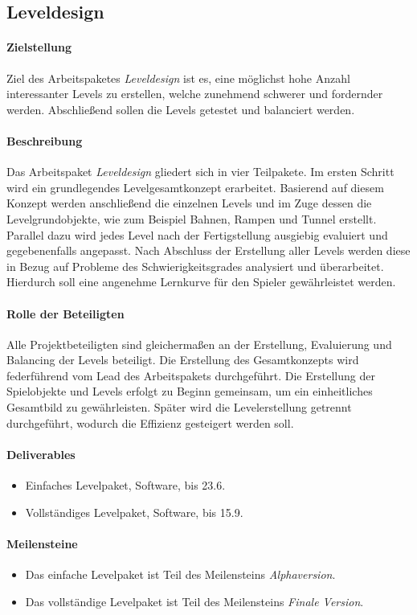 \subsection{Leveldesign}

\paragraph{Zielstellung}\noindent
Ziel des Arbeitspaketes \textit{Leveldesign} ist es, eine möglichst hohe Anzahl interessanter Levels zu erstellen, welche zunehmend schwerer und fordernder werden. Abschließend sollen die Levels getestet und balanciert werden.

\paragraph{Beschreibung}\noindent
Das Arbeitspaket \textit{Leveldesign} gliedert sich in vier Teilpakete. Im ersten Schritt wird ein grundlegendes Levelgesamtkonzept erarbeitet. Basierend auf diesem Konzept werden anschließend die einzelnen Levels und im Zuge dessen die Levelgrundobjekte, wie zum Beispiel Bahnen, Rampen und Tunnel erstellt. Parallel dazu wird jedes Level nach der Fertigstellung ausgiebig evaluiert und gegebenenfalls angepasst. Nach Abschluss der Erstellung aller Levels werden diese in Bezug auf Probleme des Schwierigkeitsgrades analysiert und überarbeitet. Hierdurch soll eine angenehme Lernkurve für den Spieler gewährleistet werden.

\paragraph{Rolle der Beteiligten}\noindent
Alle Projektbeteiligten sind gleichermaßen an der Erstellung, Evaluierung und Balancing der Levels beteiligt. Die Erstellung des Gesamtkonzepts wird federführend vom Lead des Arbeitspakets durchgeführt. Die Erstellung der Spielobjekte und Levels erfolgt zu Beginn gemeinsam, um ein einheitliches Gesamtbild zu gewährleisten. Später wird die Levelerstellung getrennt durchgeführt, wodurch die Effizienz gesteigert werden soll.

\paragraph{Deliverables}\noindent
\begin{itemize}
\item Einfaches Levelpaket, Software, bis 23.6.
\item Vollständiges Levelpaket, Software, bis 15.9.
\end{itemize}

\paragraph{Meilensteine}\noindent
\begin{itemize}
\item Das einfache Levelpaket ist Teil des Meilensteins \textit{Alphaversion}.
\item Das vollständige Levelpaket ist Teil des Meilensteins \textit{Finale Version}.
\end{itemize}